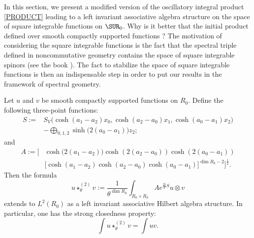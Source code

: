In this section, we present a modified version of the oscillatory integral product \eqref{PRODUCT} leading to a left invariant associative algebra structure on the space of square integrable functions on $\SUR_0$. Why is it better that the initial product defined over smooth compactly supported functions ? The motivation of considering the square integrable functions is the fact that the spectral triple defined in noncommutative geometry contains the space of square integrable spinors (see the book \cite{ConnesNCG}). The fact to stabilize the space of square integrable functions is then an indispensable step in order to put our results in the framework of spectral geometry.

\begin{theorem} 

 Let $u$ and $v$ be smooth compactly supported functions on $R_0$. Define the following three-point functions:
 \begin{equation}
\begin{split}
S:=& S_V\big(\cosh(a_1-a_2)x_0, \cosh(a_2-a_0)x_1, \cosh(a_0-a_1)x_2\big)\\
&-\bigoplus_{0,1,2}\sinh\big(2(a_0-a_1)\big)z_2;
\end{split}
\end{equation}
and 
\[ 
\begin{split}
A:= \Big[&\cosh\big(2(a_1-a_2)\big)\cosh(2(a_2- a_0))\cosh(2(a_0-a_1))\\
& \big[\cosh(a_1-a_2)\cosh(a_2- a_0)\cosh(a_0-a_1)\big]^{\dim R_0-2}\Big]^{\frac{1}{2}}.
\end{split}
\]
Then the formula                                                       
\begin{equation}\label{HILB}
u\star^{(2)}_\theta v:=\frac{1}{\theta^{\dim R_0}}
\int_{R_0\times R_0}Ae^{\frac{2i}{\theta}S}u\otimes v
\end{equation}
extends to $L^2(R_0)$ as a left invariant associative Hilbert algebra structure. In particular, one has the strong closedness property:
\begin{equation*}
\int u\star^{(2)}_\theta v=\int uv.
\end{equation*}
\label{thmL2}
\end{theorem}
